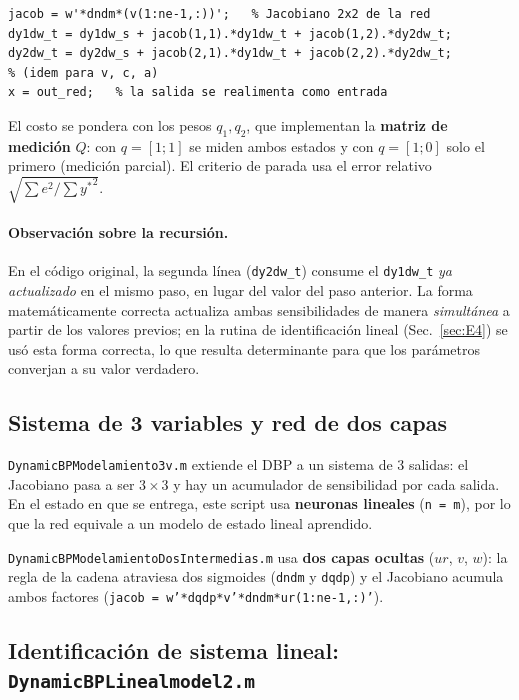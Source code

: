 \documentclass[11pt,a4paper]{article}
\newcommand{\code}[1]{\texttt{\small #1}}
\begin{document}
\begin{lstlisting}[caption={Recursión de derivadas totales (DBP) para 2 salidas.}]
jacob = w'*dndm*(v(1:ne-1,:))';   % Jacobiano 2x2 de la red
dy1dw_t = dy1dw_s + jacob(1,1).*dy1dw_t + jacob(1,2).*dy2dw_t;
dy2dw_t = dy2dw_s + jacob(2,1).*dy1dw_t + jacob(2,2).*dy2dw_t;
% (idem para v, c, a)
x = out_red;   % la salida se realimenta como entrada
\end{lstlisting}

El costo se pondera con los pesos $q_1,q_2$, que implementan la \textbf{matriz de
medición} $Q$: con $q=[1;1]$ se miden ambos estados y con $q=[1;0]$ solo el primero
(medición parcial). El criterio de parada usa el error relativo
$\sqrt{\sum e^2/\sum {y^*}^2}$.

\paragraph{Observación sobre la recursión.} En el código original, la segunda línea
(\code{dy2dw\_t}) consume el \code{dy1dw\_t} \emph{ya actualizado} en el mismo paso, en
lugar del valor del paso anterior. La forma matemáticamente correcta actualiza ambas
sensibilidades de manera \emph{simultánea} a partir de los valores previos; en la rutina
de identificación lineal (Sec.~\ref{sec:E4}) se usó esta forma correcta, lo que resulta
determinante para que los parámetros converjan a su valor verdadero.

\subsection{Sistema de 3 variables y red de dos capas}

\code{DynamicBPModelamiento3v.m} extiende el DBP a un sistema de 3 salidas: el Jacobiano
pasa a ser $3\times3$ y hay un acumulador de sensibilidad por cada salida. En el estado
en que se entrega, este script usa \textbf{neuronas lineales} (\code{n = m}), por lo que
la red equivale a un modelo de estado lineal aprendido.

\code{DynamicBPModelamientoDosIntermedias.m} usa \textbf{dos capas ocultas}
($ur$, $v$, $w$): la regla de la cadena atraviesa dos sigmoides
(\code{dndm} y \code{dqdp}) y el Jacobiano acumula ambos factores
(\code{jacob = w'*dqdp*v'*dndm*ur(1:ne-1,:)'}).

\subsection{Identificación de sistema lineal: \texttt{DynamicBPLinealmodel2.m}}
\label{sec:codeE4}
\end{document}
